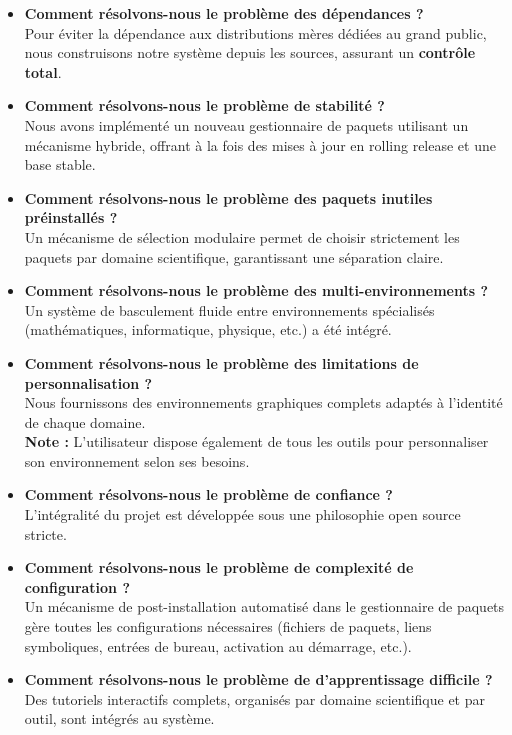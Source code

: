\begin{itemize}[leftmargin=*,nosep]
\begin{itemize}
    
    
    \item \textbf{Comment résolvons-nous le problème des dépendances ?}\\ Pour éviter la dépendance aux distributions mères dédiées au grand public, nous construisons notre système depuis les sources, assurant un \textbf{contrôle total}. \\
    
    \item \textbf{Comment résolvons-nous le problème de stabilité ?}\\ Nous avons implémenté un nouveau gestionnaire de paquets utilisant un mécanisme hybride, offrant à la fois des mises à jour en rolling release et une base stable. \\
    
    \item \textbf{Comment résolvons-nous le problème des paquets inutiles préinstallés ?}\\ Un mécanisme de sélection modulaire permet de choisir strictement les paquets par domaine scientifique, garantissant une séparation claire.\\
    
    \item \textbf{Comment résolvons-nous le problème des multi-environnements ?}\\ Un système de basculement fluide entre environnements spécialisés (mathématiques, informatique, physique, etc.) a été intégré.
    \\
    \item \textbf{Comment résolvons-nous le problème des limitations de personnalisation ?}\\ Nous fournissons des environnements graphiques complets adaptés à l’identité de chaque domaine. \\
    \textbf{Note :} L’utilisateur dispose également de tous les outils pour personnaliser son environnement selon ses besoins.
    \\
    \item \textbf{Comment résolvons-nous le problème de confiance ?} \\L’intégralité du projet est développée sous une philosophie open source stricte.\\
    
    \item \textbf{Comment résolvons-nous le problème de complexité de configuration ?}\\ Un mécanisme de post-installation automatisé dans le gestionnaire de paquets gère toutes les configurations nécessaires (fichiers de paquets, liens symboliques, entrées de bureau, activation au démarrage, etc.).\\
    \item \textbf{Comment résolvons-nous le problème de d’apprentissage difficile ?}\\Des tutoriels interactifs complets, organisés par domaine scientifique et par outil, sont intégrés au système.\\
\end{itemize}
\clearpage

\end{itemize}
